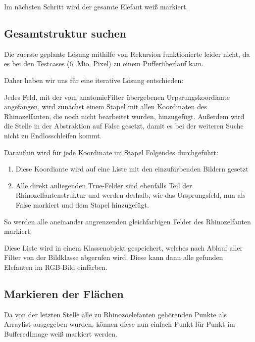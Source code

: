 		Im nächsten Schritt wird der gesamte Elefant weiß markiert.

	\subsection {Gesamtstruktur suchen}
	Die zuerste geplante Lösung mithilfe von Rekursion funktionierte leider nicht, da es bei den Testcases (6. Mio. Pixel) zu einem Pufferüberlauf kam.

	Daher haben wir uns für eine iterative Lösung entschieden:

	Jedes Feld, mit der vom anatomieFilter übergebenen Urpsrungskoordiante angefangen, wird zunächst einem Stapel mit allen Koordinaten des Rhinozelfanten, die noch nicht bearbeitet wurden, hinzugefügt. Außerdem wird die Stelle in der Abstraktion auf False gesetzt, damit es bei der weiteren Suche nicht zu Endlosschleifen kommt.

	Daraufhin wird für jede Koordinate im Stapel Folgendes durchgeführt:

	\begin{enumerate}
		\item Diese Koordiante wird auf eine Liste mit den einzufärbenden Bildern gesetzt
		\item Alle direkt anliegenden True-Felder sind ebenfalls Teil der Rhinozelfantenstruktur und werden deshalb, wie das Ursprungsfeld, nun als False markiert und dem Stapel hinzugefügt.
	\end{enumerate}

	So werden alle aneinander angrenzenden gleichfarbigen Felder des Rhinozelfanten markiert. 

	Diese Liste wird in einem Klassenobjekt gespeichert, welches nach Ablauf aller Filter von der Bildklasse abgerufen wird. Diese kann dann alle gefunden Elefanten im RGB-Bild einfärben.

	\subsection {Markieren der Flächen}

	Da von der letzten Stelle alle zu Rhinozoelefanten gehörenden Punkte als Arraylist ausgegeben wurden, können diese nun einfach Punkt für Punkt im BufferedImage weiß markiert werden.